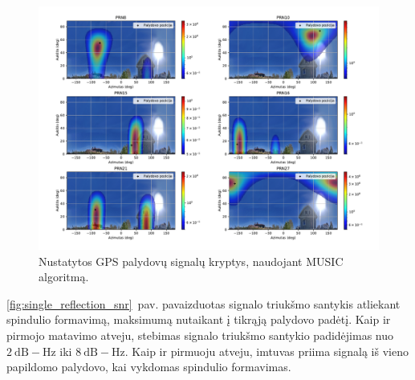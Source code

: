 \documentclass[main.tex]{subfiles}
\begin{document}
\begin{figure}[ht]
    \begin{centering}
    \includegraphics[scale=0.45]{drawings/one_reflection_2}
    \par\end{centering}
    \protect\caption{\label{fig:single_reflection}Nustatytos GPS palydovų signalų kryptys, naudojant MUSIC algoritmą.}
\end{figure}

\ref{fig:single_reflection_snr}~pav. pavaizduotas signalo triukšmo santykis atliekant spindulio formavimą,
maksimumą nutaikant į tikrąją palydovo padėtį. Kaip ir pirmojo matavimo atveju, stebimas signalo triukšmo
santykio padidėjimas
nuo $2\ \mathrm{dB-Hz}$ iki $8\ \mathrm{dB-Hz}$. Kaip ir pirmuoju atveju,
imtuvas priima signalą iš vieno papildomo palydovo, kai vykdomas spindulio formavimas.
\end{document}
